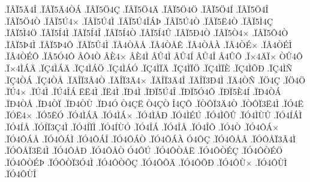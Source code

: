 {.^^cf^^c2^^cf5^^c44^^ce
.^^cf^^c2^^cf5^^c44^^d2^^c1
.^^cf^^c2^^cf5^^d64^^c7
.^^cf^^c2^^cf5^^d64^^c4
.^^cf^^c2^^cf5^^d64^^d6
.^^cf^^c2^^cf5^^d64^^cd
.^^cf^^c2^^cf5^^d64^^ce
.^^cf^^c2^^cf5^^d64^^d2
.^^cf^^c2^^cf5^^da4^^d7
.^^cf^^c2^^cf5^^da4^^cc
.^^cf^^c2^^cf5^^da4^^ce^^c1^^de
.^^cf^^c2^^cf5^^da4^^d2
.^^cf^^c2^^cf5^^cb4^^d2
.^^cf^^c2^^cf5^^cc4^^c7
.^^cf^^c2^^cf5^^cc4^^d6
.^^cf^^c2^^cf5^^cd4^^cc
.^^cf^^c2^^cf5^^cd4^^ce
.^^cf^^c2^^cf5^^cd4^^d2
.^^cf^^c2^^cf5^^cd4^^db
.^^cf^^c2^^cf5^^d04^^d2
.^^cf^^c2^^cf5^^d24^^d7
.^^cf^^c2^^cf5^^d44^^d2
.^^cf^^c2^^cf5^^de4^^cc
.^^cf^^c2^^cf5^^de4^^d4
.^^cf^^c2^^cf5^^db4^^cc
.^^cf^^c24^^d2^^c5^^c5
.^^cf^^c24^^d2^^c5^^ca
.^^cf^^c24^^d2^^c5^^c0
.^^cf^^c24^^d2^^c9^^d7
.^^cf^^c24^^d2^^c9^^cc
.^^cf^^c24^^d2^^c9^^d4
.^^cf^^c25^^d34^^d4
^^c2^^d44^^d2
^^c2^^c84^^d7
^^c2^^c84^^cc
^^c2^^db4^^cc
^^c2^^db4^^cd
^^c2^^db4^^ce
^^c24^^db^^d4
.^^cf^^d74^^c4^^cf^^d7
^^d2^^db4^^d4
.^^cf^^d74^^cc^^c1^^c4
.^^cf^^c74^^cc^^c1^^c4
.^^cf^^c74^^cc^^c1^^d6
.^^cf^^c74^^cc^^c1^^d3
.^^cf^^c74^^cc^^cf^^c4
.^^cf^^c74^^cc^^cf^^d6
.^^cf^^c74^^cc^^cf^^c8
.^^cf^^c74^^cc^^d5^^d0
.^^cf^^c74^^cc^^d1
.^^cf^^c74^^d2^^c1
.^^cf^^c74^^d2^^c5
.^^cf^^c4^^ce^^cf3^^c24^^d2
.^^cf^^c4^^ce^^cf3^^c44^^d7
.^^cf^^c4^^ce^^cf3^^c44^^ce
.^^cf^^c4^^ce^^cf3^^d04^^cc
.^^cf^^c44^^d2^^d1
.^^cf^^d64^^c7
.^^cf^^d64^^d6
.^^cf^^da4^^d7
.^^cf^^da4^^cc
.^^cf^^da4^^ce^^c1
^^cb^^cb4^^cc
.^^cf^^cb4^^cc
.^^cf^^d04^^cc
.^^cf^^d0^^cf5^^da4^^ce
.^^cf^^d0^^cf5^^d34^^d4
.^^cf^^d0^^cf5^^c84^^cd
.^^cf^^d04^^d2^^c1
.^^cf^^d04^^d2^^c5
.^^cf^^d04^^d2^^cf
.^^cf^^d04^^d2^^d9
.^^cf^^d04^^d3
^^d24^^c7^^cb
^^d24^^c7^^d2
^^ce4^^c7^^d4
.^^cf^^d2^^d4^^cf3^^c44^^d2
.^^cf^^d2^^d4^^cf3^^cb4^^cc
.^^cf^^d34^^cb
.^^cf^^d3^^cb4^^d7
.^^cf^^d35^^cb^^d3
.^^cf^^d34^^cc^^c1^^c2
.^^cf^^d34^^cc^^c1^^d7
.^^cf^^d34^^cc^^c5^^d0
.^^cf^^d34^^cc^^c9^^da
.^^cf^^d34^^cc^^d5^^db
.^^cf^^d34^^cc^^d9^^db
.^^cf^^d34^^cd^^c1^^cc
.^^cf^^d34^^cd^^c5
.^^cf^^d3^^cd^^cf3^^c74^^cc
.^^cf^^d34^^cd^^cf^^cc
.^^cf^^d34^^cd^^d9^^d3
.^^cf^^d34^^ce^^c1
.^^cf^^d34^^ce^^c5
.^^cf^^d34^^ce^^d5
.^^cf^^d34^^d2
.^^cf^^d34^^d4^^c1^^d7
.^^cf^^d34^^d4^^c1^^c5
.^^cf^^d34^^d4^^c1^^cc
.^^cf^^d34^^d4^^c1^^ce
.^^cf^^d34^^d4^^c1^^d2
.^^cf^^d34^^d4^^c1^^c0
^^d34^^d4^^c7
.^^cf^^d34^^d4^^c5^^c2
.^^cf^^d3^^d4^^c5^^cf3^^c24^^cc
.^^cf^^d3^^d4^^c5^^cf3^^cb4^^cc
.^^cf^^d34^^d4^^c5^^d0
.^^cf^^d34^^d4^^c5^^d2
^^d34^^d4^^da
.^^cf^^d34^^d4^^d2^^c5^^cb
.^^cf^^d34^^d4^^d2^^c9^^c7
.^^cf^^d34^^d4^^d2^^c9^^d6
.^^cf^^d34^^d4^^d2^^c9^^de
.^^cf^^d3^^d4^^d2^^cf3^^d34^^cc
.^^cf^^d34^^d4^^d2^^d5^^c7
.^^cf^^d34^^d4^^d5^^c4
.^^cf^^d34^^d4^^d5^^d0
.^^cf^^d34^^d4^^d9^^d7
.^^cf^^d34^^d4^^d9^^cc
.^^cf^^d34^^d4^^d9^^ce
}
